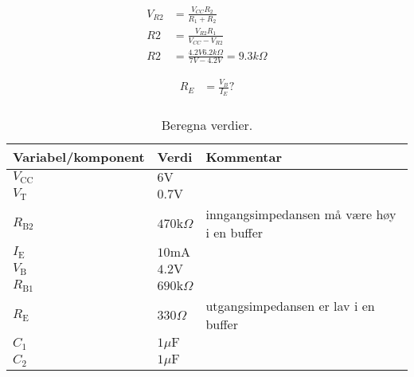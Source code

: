 \begin{equation}
\label{eq:R2}
\begin{split}
V_{R2} &= \frac{V_{CC} R_2}{R_1 + R_2}\\
R2 &= \frac{V_{R2} R_1}{V_{CC}-V_{R2}}\\
R2 &= \frac{4.2V 6.2k\Omega}{7V-4.2V} = 9.3k\Omega
\end{split}
\end{equation}

\begin{equation}
\label{eq:RE}
\begin{split}
R_{E} &= \frac{V_{B}}{I_{E}}?\\ 
\end{split}
\end{equation}


\vspace{1cm}
\begin{table}[!h]
\centering %
\caption{Beregna verdier.}
\label{tab:vars}	%
\begin{tabular}{lll} %
\toprule %
\textbf{Variabel/komponent} & \textbf{Verdi} & \textbf{Kommentar} \\
\midrule
$V_{\text{CC}}$ & $6\text{V}$ & \\
$V_\text{T}$ & $0.7\text{V}$ & \\
$R_{\text{B}2}$ & $470\text{k}\Omega$ & inngangsimpedansen må være høy i en buffer \\
$I_\text{E}$ & $10\text{mA}$ & \\
$V_\text{B}$ & $4.2\text{V}$ & \\
$R_{\text{B}1}$ & $690\text{k}\Omega$ & \\
$R_\text{E}$ & $330\Omega$ & utgangsimpedansen er lav i en buffer \\
$C_1$ & $1\mu\text{F}$ & \\
$C_2$ & $1\mu\text{F}$ & \\
\bottomrule 
\end{tabular}
\end{table}
\vspace{1cm}
